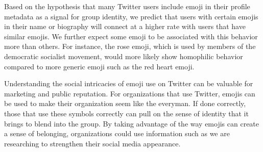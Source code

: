Based on the hypothesis that many Twitter users include emoji in their
profile metadata as a signal for group identity, we predict that users
with certain emojis in their name or biography will connect at a
higher rate with users that have similar emojis. We further expect
some emoji to be associated with this behavior more than others. For
instance, the rose emoji, which is used by members of the democratic
socialist movement, would more likely show homophilic behavior
compared to more generic emoji such as the red heart emoji.

Understanding the social intricacies of emoji use on Twitter can be
valuable for marketing and public reputation. For organizations that
use Twitter, emojis can be used to make their organization seem like
the everyman. If done correctly, those that use these symbols
correctly can pull on the sense of identity that it brings to blend
into the group. By taking advantage of the way emojis can create a
sense of belonging, organizations could use information such as we are
researching to strengthen their social media appearance.

